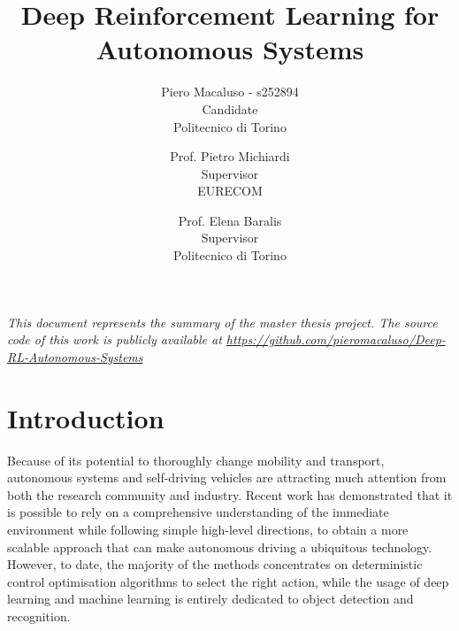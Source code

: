 \documentclass[10pt,twocolumn,letterpaper]{article}
\begin{document}
\title{Deep Reinforcement Learning for Autonomous Systems}

\author{Piero Macaluso - s252894\\
    Candidate\\
    Politecnico di Torino\\
    \and
    Prof. Pietro Michiardi\\
    Supervisor\\
    EURECOM\\
    \and
    Prof. Elena Baralis\\
    Supervisor\\
    Politecnico di Torino\\
}

\maketitle


\textit{This document represents the summary of the master thesis project. The source code of this work is publicly available at \url{https://github.com/pieromacaluso/Deep-RL-Autonomous-Systems}}
\section{Introduction}

Because of its potential to thoroughly change mobility and transport, autonomous systems and self-driving vehicles are attracting much attention from both the research community and industry.
Recent work has demonstrated that it is possible to rely on a comprehensive understanding of the immediate environment while following simple high-level directions, to obtain a more scalable approach that can make autonomous driving a ubiquitous technology.
However, to date, the majority of the methods concentrates on deterministic control optimisation algorithms to select the right action, while the usage of deep learning and machine learning is entirely dedicated to object detection and recognition.
\end{document}
